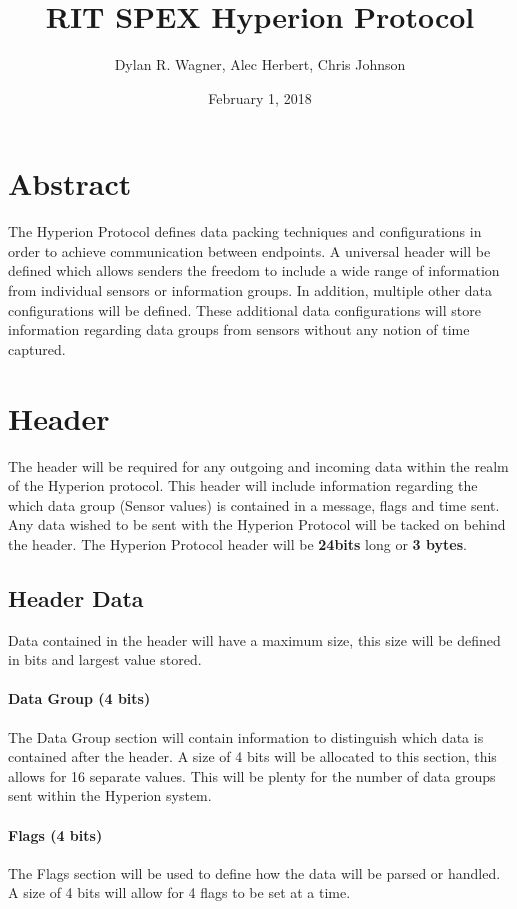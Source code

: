 \documentclass{article}
\title{RIT SPEX Hyperion Protocol}
\date{February 1, 2018}
\author{Dylan R. Wagner, Alec Herbert, Chris Johnson}
\begin{document}
  \maketitle
  
  \section{Abstract}
  The Hyperion Protocol defines data packing techniques and configurations in order to achieve communication between endpoints. A universal header will be defined which allows senders the freedom to include a wide range of information from individual sensors or information groups. In addition, multiple other data configurations will be defined. These additional data configurations will store information regarding data groups from sensors without any notion of time captured.
  
  \section{Header}
  The header will be required for any outgoing and incoming data within the realm of the Hyperion protocol. This header will include information regarding the which data group (Sensor values) is contained in a message, flags and time sent. Any data wished to be sent with the Hyperion Protocol will be tacked on behind the header.  The Hyperion Protocol header will be \textbf{24bits} long or \textbf{3 bytes}.
  \subsection{Header Data}
  Data contained in the header will have a maximum size, this size will be defined in bits and largest value stored. 
  
  \paragraph{Data Group (4 bits)}
  The Data Group section will contain information to distinguish which data is contained after the header. A size of 4 bits will be allocated to this section, this allows for 16 separate values. This will be plenty for the number of data groups sent within the Hyperion system. 
  
  \paragraph{Flags (4 bits)}
  The Flags section will be used to define how the data will be parsed or handled. A size of 4 bits will allow for 4 flags to be set at a time.
  
\end{document}
